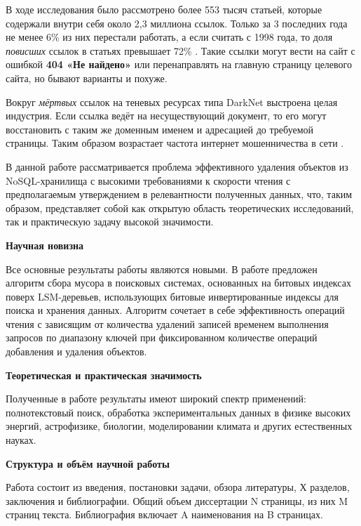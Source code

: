 В ходе исследования было рассмотрено более 553 тысяч статьей, которые содержали
внутри себя около 2,3 миллиона ссылок. Только за 3 последних года не менее 6\%
из них перестали работать, а если считать с 1998 года, то доля \textit{повисших}
ссылок в статьях превышает 72\% \cite{NYT}. Такие ссылки могут вести на сайт с
ошибкой \textbf{404 «Не найдено»} или перенаправлять на главную страницу целевого
сайта, но бывают варианты и похуже.

Вокруг \textit{мёртвых} ссылок на теневых ресурсах типа DarkNet выстроена целая
индустрия. Если ссылка ведёт на несуществующий документ, то его могут восстановить
с таким же доменным именем и адресацией до требуемой страницы. Таким образом
возрастает частота интернет мошенничества в сети \cite{Fraud}.

В данной работе рассматривается проблема эффективного удаления объектов из
NoSQL-хранилища с высокими требованиями к скорости чтения с предполагаемым
утверждением в релевантности полученных данных, что, таким образом, представляет
собой как открытую область теоретических исследований, так и практическую задачу
высокой значимости.

\textbf{Научная новизна}

Все основные результаты работы являются новыми. В работе предложен алгоритм
сбора мусора в поисковых системах, основанных на битовых индексах
поверх LSM-деревьев, использующих битовые инвертированные индексы для поиска и
хранения данных. Алгоритм сочетает в себе эффективность операций чтения с
зависящим от количества удалений записей временем выполнения запросов по
диапазону ключей при фиксированном количестве операций добавления и удаления
объектов.

\textbf{Теоретическая и практическая значимость}

Полученные в работе результаты имеют широкий спектр применений: полнотекстовый поиск,
обработка экспериментальных данных в физике высоких энергий, астрофизике, биологии,
моделировании климата и других естественных науках.

\textbf{Структура и объём научной работы}

Работа состоит из введения, постановки задачи, обзора литературы, Х
разделов, заключения и библиографии. Общий объем диссертации N страницы, из
них M страниц текста. Библиография включает A наименования на B страницах.

